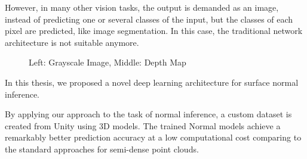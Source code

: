 However, in many other vision tasks, the output is demanded as an image, instead of predicting one or several classes of the input, but the classes of each pixel are predicted, like image segmentation\cite{unet}. In this case, the traditional network architecture is not suitable anymore.

\begin{figure}[!h]
	\centering
	\caption{Left: Grayscale Image, Middle: Depth Map}
	\label{fig:improved_normal_inference}
\end{figure}


In this thesis, we proposed a novel deep learning architecture for surface normal inference. 

By applying our approach to the task of normal inference, a custom dataset is created from Unity using 3D models. The trained Normal models achieve a remarkably better prediction accuracy at a low computational cost comparing to the standard approaches for semi-dense point clouds. 




















